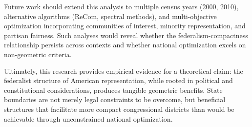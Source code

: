 Future work should extend this analysis to multiple census years (2000, 2010), alternative algorithms (ReCom, spectral methods), and multi-objective optimization incorporating communities of interest, minority representation, and partisan fairness. Such analyses would reveal whether the federalism-compactness relationship persists across contexts and whether national optimization excels on non-geometric criteria.

Ultimately, this research provides empirical evidence for a theoretical claim: the federalist structure of American representation, while rooted in political and constitutional considerations, produces tangible geometric benefits. State boundaries are not merely legal constraints to be overcome, but beneficial structures that facilitate more compact congressional districts than would be achievable through unconstrained national optimization.
